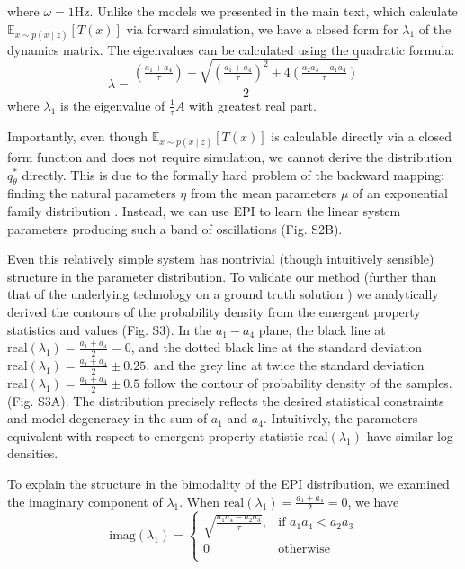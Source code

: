 \documentclass[11pt]{article}
\begin{document}
where $\omega = 1$Hz.  Unlike the models we presented in the main text, which calculate $\mathbb{E}_{x \sim p(x \mid z)} \left[T(x) \right]$ via forward simulation, we have a closed  form for $\lambda_1$ of the dynamics matrix.  The eigenvalues can be calculated using the quadratic formula: 
\begin{equation}
\lambda = \frac{(\frac{a_1 + a_4}{\tau}) \pm \sqrt{(\frac{a_1+a_4}{\tau})^2 + 4(\frac{a_2 a_3 - a_1 a_4}{\tau})}}{2}
\end{equation}
where $\lambda_1$ is the eigenvalue of $\frac{1}{\tau}A$ with greatest real part. 

Importantly, even though $\mathbb{E}_{x\sim p(x \mid z)}\left[T(x)\right]$ is calculable directly via a closed form function and does not require simulation, we cannot derive the distribution $q^*_\theta$ directly.  This is due to the formally hard problem of the backward mapping: finding the natural parameters $\eta$ from the mean parameters $\mu$ of an exponential family distribution \cite{wainwright2008graphical}.  Instead, we can use EPI to learn the linear system parameters producing such a band of oscillations (Fig. S2B). 

Even this relatively simple system has nontrivial (though intuitively sensible) structure in the parameter distribution.  To validate our method (further than that of the underlying technology on a ground truth solution \cite{loaiza2017maximum}) we analytically derived the contours of the probability density from the emergent property statistics and values (Fig. S3).  In the $a_1-a_4$ plane, the black line at $\text{real}(\lambda_1) = \frac{a_1 + a_4}{2} = 0$, and the dotted black line at
the standard deviation $\text{real}(\lambda_1) = \frac{a_1 + a_4}{2} \pm 0.25$, and the grey line at twice the standard deviation
$\text{real}(\lambda_1) = \frac{a_1 + a_4}{2} \pm 0.5$ follow the contour of probability density of the samples. (Fig. S3A). The distribution precisely reflects the desired statistical constraints and model degeneracy in the sum of
$a_1$ and $a_4$. Intuitively, the parameters equivalent with respect to emergent property statistic $\text{real}(\lambda_1)$ have similar log densities.

To explain the structure in the bimodality of the EPI distribution, we examined the imaginary component of $\lambda_1$.  When $\text{real}(\lambda_1) = \frac{a_1 + a_4}{2} = 0$, we have
\begin{equation}
\text{imag}(\lambda_1) = \begin{cases}
                             \sqrt{\frac{a_1 a_4 - a_2 a_3}{\tau}},  & \text{if } a_1 a_4 < a_2 a_3 \\
                             0 & \text{otherwise } \\
                         \end{cases} 
\end{equation}
\end{document}
